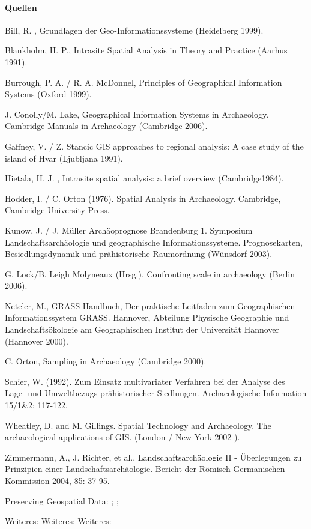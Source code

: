 \paragraph{Quellen}
\begin{flushleft}
Bill, R. , Grundlagen der Geo-Informationssysteme (Heidelberg 1999).
	
Blankholm, H. P., Intrasite Spatial Analysis in Theory and Practice (Aarhus 1991).
	
Burrough, P. A. / R. A. McDonnel, Principles of Geographical Information Systems (Oxford 1999).

J. Conolly/M. Lake, Geographical Information Systems in Archaeology. Cambridge Manuals in Archaeology (Cambridge 2006).

Gaffney, V. / Z. Stancic GIS approaches to regional analysis: A case study of the island of Hvar (Ljubljana 1991).
	
Hietala, H. J. , Intrasite spatial analysis: a brief overview (Cambridge1984).
	
Hodder, I. / C. Orton (1976). Spatial Analysis in Archaeology. Cambridge, Cambridge University Press.

Kunow, J. / J. Müller Archäoprognose Brandenburg 1. Symposium Landschaftsarchäologie und geographische Informationssysteme. Prognosekarten, Besiedlungsdynamik und prähistorische Raumordnung (Wünsdorf 2003).

G. Lock/B. Leigh Molyneaux (Hrsg.), Confronting scale in archaeology (Berlin 2006).
	
Neteler, M., GRASS-Handbuch, Der praktische Leitfaden zum Geographischen Informationssystem GRASS. Hannover, Abteilung Physische Geographie und Landschaftsökologie am Geographischen Institut der Universität Hannover (Hannover 2000).

C. Orton, Sampling in Archaeology  (Cambridge 2000).

Schier, W. (1992). Zum Einsatz multivariater Verfahren bei der Analyse des Lage- und Umweltbezugs prähistorischer Siedlungen. Archaeologische Information 15/1\&2: 117-122.
	
Wheatley, D. and M. Gillings. Spatial Technology and Archaeology. The archaeological applications of GIS. (London / New York 2002 ).

Zimmermann, A., J. Richter, et al., Landschaftsarchäologie II - Überlegungen zu Prinzipien einer Landschaftsarchäologie. Bericht der Römisch-Germanischen Kommission 2004, 85: 37-95.
	
Preserving Geospatial Data: ; ; 

Weiteres: 
Weiteres: 
Weiteres: 
\end{flushleft}